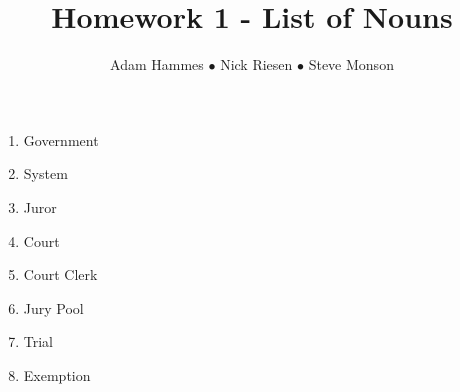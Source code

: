 \documentclass{article}
\title{Homework 1 - List of Nouns}
\author{Adam Hammes $\bullet$ Nick Riesen $\bullet$ Steve Monson}
\begin{document}
\maketitle

\begin{enumerate}
    \item Government
    \item System
    \item Juror
    \item Court
    \item Court Clerk
    \item Jury Pool
    \item Trial
    \item Exemption
\end{enumerate}
\end{document}
